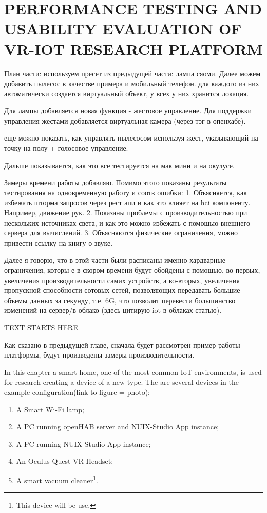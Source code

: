 
\chapter{PERFORMANCE TESTING AND USABILITY EVALUATION OF VR-IOT RESEARCH PLATFORM}


План части: используем пресет из предыдущей части: лампа сяоми. Далее можем добавить пылесос в качестве примера и мобильный телефон. для каждого из них автоматически создается виртуальный объект, у всех у них хранится локация.

Для лампы добавляется новая функция - жестовое управление. Для поддержки управления жестами добавляется виртуальная камера (через тэг в опенхабе).

еще можно показать, как управлять пылесосом используя жест, указывающий на точку на полу + голосовое управление.

Дальше показывается, как это все тестируется на мак мини и на окулусе.

Замеры времени работы добавляю. Помимо этого показаны результаты тестирования на одновременную работу и соотв ошибки:
1. Объясняется, как избежать шторма запросов через рест апи и как это влияет на hci компоненту. Например, движение рук.
2. Показаны проблемы с производительностью при нескольких источниках света, и как это можно избежать с помощью внешнего сервера для вычислений.
3. Объясняются физические ограничения, можно привести ссылку на книгу о звуке.

Далее я говорю, что в этой части были расписаны именно хардварные ограничения, которы е в скором времени будут обойдены с помощью, во-первых, увеличения производительности самих устройств, а во-вторых, увеличения пропускной способности сотовых сетей, позволяющих передавать большие объемы данных за секунду, т.е. 6G, что позволит перевести большинство изменений на сервер/в облако (здесь цитирую iot в облаках статью).


TEXT STARTS HERE

Как сказано в предыдущей главе, сначала будет рассмотрен пример работы платформы, будут произведены замеры производительности.

In this chapter a smart home, one of the most common IoT environments, is used for research creating a device of a new type. The are several devices in the example configuration(link to figure = photo): 
\begin{enumerate}
    \item A Smart Wi-Fi lamp;
    \item A PC running openHAB server and NUIX-Studio App instance;
    \item A PC running NUIX-Studio App instance;
    \item An Oculus Quest VR Headset;
    \item A smart vacuum cleaner\footnote{This device will be use.}.
\end{enumerate}

